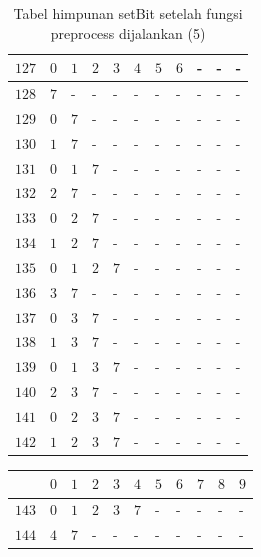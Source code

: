 \begin{appendices}
\begin{table}[H]
\begin{tabular} {|l|l|l|l|l|l|l|l|l|l|l|}
  		$ 127 $ & $ 0 $ &$ 1 $ &$ 2 $ &$ 3 $ &$ 4 $ &$ 5 $ &$ 6 $ & - &  - &  -   \\ \hline
  		$ 128 $ & $ 7 $ & - &  - &  - &  - &  - &  - &  - &  - &  -   \\ \hline
  		$ 129 $ & $ 0 $ &$ 7 $ & - &  - &  - &  - &  - &  - &  - &  -   \\ \hline
  		$ 130 $ & $ 1 $ &$ 7 $ & - &  - &  - &  - &  - &  - &  - &  -   \\ \hline
  		$ 131 $ & $ 0 $ &$ 1 $ &$ 7 $ & - &  - &  - &  - &  - &  - &  -   \\ \hline
  		$ 132 $ & $ 2 $ &$ 7 $ & - &  - &  - &  - &  - &  - &  - &  -   \\ \hline
  		$ 133 $ & $ 0 $ &$ 2 $ &$ 7 $ & - &  - &  - &  - &  - &  - &  -   \\ \hline
  		$ 134 $ & $ 1 $ &$ 2 $ &$ 7 $ & - &  - &  - &  - &  - &  - &  -   \\ \hline
  		$ 135 $ & $ 0 $ &$ 1 $ &$ 2 $ &$ 7 $ & - &  - &  - &  - &  - &  -   \\ \hline
  		$ 136 $ & $ 3 $ &$ 7 $ & - &  - &  - &  - &  - &  - &  - &  -   \\ \hline
  		$ 137 $ & $ 0 $ &$ 3 $ &$ 7 $ & - &  - &  - &  - &  - &  - &  -   \\ \hline
  		$ 138 $ & $ 1 $ &$ 3 $ &$ 7 $ & - &  - &  - &  - &  - &  - &  -   \\ \hline
  		$ 139 $ & $ 0 $ &$ 1 $ &$ 3 $ &$ 7 $ & - &  - &  - &  - &  - &  -   \\ \hline
  		$ 140 $ & $ 2 $ &$ 3 $ &$ 7 $ & - &  - &  - &  - &  - &  - &  -   \\ \hline
  		$ 141 $ & $ 0 $ &$ 2 $ &$ 3 $ &$ 7 $ & - &  - &  - &  - &  - &  -   \\ \hline
  		$ 142 $ & $ 1 $ &$ 2 $ &$ 3 $ &$ 7 $ & - &  - &  - &  - &  - &  -   \\ \hline  		
  	\end{tabular}\caption{Tabel himpunan setBit setelah fungsi preprocess dijalankan (5)}
  	\label{tab:setbit_5}
  \end{table}
  \begin{table}[H]
  	\centering
  	\begin{tabular} {|l|l|l|l|l|l|l|l|l|l|l|} \hline
  		\backslashbox{$Num$}{$index$} & $ 0 $ & $ 1 $ & $ 2 $ & $ 3 $ & $ 4 $ & $ 5 $ & $ 6 $ & $ 7 $ & $ 8 $ & $ 9 $ \\ \hline
  		$ 143 $ & $ 0 $ &$ 1 $ &$ 2 $ &$ 3 $ &$ 7 $ & - &  - &  - &  - &  -   \\ \hline
  		$ 144 $ & $ 4 $ &$ 7 $ & - &  - &  - &  - &  - &  - &  - &  -   \\ \hline

\end{tabular}
\end{table}
\end{appendices}
